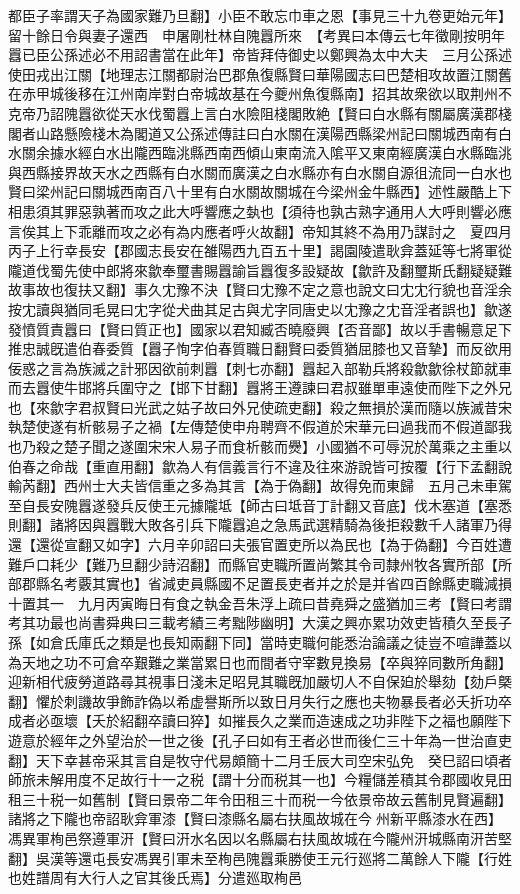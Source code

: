 都臣子率謂天子為國家難乃旦翻】小臣不敢忘巾車之恩【事見三十九卷更始元年】留十餘日令與妻子還西　申屠剛杜林自隗囂所來　【考異曰本傳云七年徵剛按明年囂已臣公孫述必不用詔書當在此年】帝皆拜侍御史以鄭興為太中大夫　三月公孫述使田戎出江關【地理志江關都尉治巴郡魚復縣賢曰華陽國志曰巴楚相攻故置江關舊在赤甲城後移在江州南岸對白帝城故基在今夔州魚復縣南】招其故衆欲以取荆州不克帝乃詔隗囂欲從天水伐蜀囂上言白水險阻棧閣敗絶【賢曰白水縣有關屬廣漢郡棧閣者山路懸險棧木為閣道又公孫述傳註曰白水關在漢陽西縣梁州記曰關城西南有白水關余據水經白水出隴西臨洮縣西南西傾山東南流入隂平又東南經廣漢白水縣臨洮與西縣接界故天水之西縣有白水關而廣漢之白水縣亦有白水關自源徂流同一白水也賢曰梁州記曰關城西南百八十里有白水關故關城在今梁州金牛縣西】述性嚴酷上下相患須其罪惡孰著而攻之此大呼響應之埶也【須待也孰古熟字通用人大呼則響必應言俟其上下乖離而攻之必有為内應者呼火故翻】帝知其終不為用乃謀討之　夏四月丙子上行幸長安【郡國志長安在雒陽西九百五十里】謁園陵遣耿弇蓋延等七將軍從隴道伐蜀先使中郎將來歙奉璽書賜囂諭旨囂復多設疑故【歙許及翻璽斯氏翻疑疑難故事故也復扶又翻】事久冘豫不決【賢曰冘豫不定之意也說文曰冘冘行貌也音淫余按冘讀與猶同毛晃曰冘字從犬曲其足古與尤字同唐史以冘豫之冘音淫者誤也】歙遂發憤質責囂曰【賢曰質正也】國家以君知臧否曉廢興【否音鄙】故以手書暢意足下推忠誠旣遣伯春委質【囂子恂字伯春質職日翻賢曰委質猶屈膝也又音摯】而反欲用佞惑之言為族滅之計邪因欲前刺囂【刺七亦翻】囂起入部勒兵將殺歙歙徐杖節就車而去囂使牛邯將兵圍守之【邯下甘翻】囂將王遵諫曰君叔雖單車遠使而陛下之外兄也【來歙字君叔賢曰光武之姑子故曰外兄使疏吏翻】殺之無損於漢而隨以族滅昔宋執楚使遂有析骸易子之禍【左傳楚使申舟聘齊不假道於宋華元曰過我而不假道鄙我也乃殺之楚子聞之遂圍宋宋人易子而食析骸而㸑】小國猶不可辱況於萬乘之主重以伯春之命哉【重直用翻】歙為人有信義言行不違及往來游說皆可按覆【行下孟翻說輸芮翻】西州士大夫皆信重之多為其言【為于偽翻】故得免而東歸　五月己未車駕至自長安隗囂遂發兵反使王元據隴坻【師古曰坻音丁計翻又音底】伐木塞道【塞悉則翻】諸將因與囂戰大敗各引兵下隴囂追之急馬武選精騎為後拒殺數千人諸軍乃得還【還從宣翻又如字】六月辛卯詔曰夫張官置吏所以為民也【為于偽翻】今百姓遭難戶口耗少【難乃旦翻少詩沼翻】而縣官吏職所置尚繁其令司隸州牧各實所部【所部郡縣名考覈其實也】省減吏員縣國不足置長吏者并之於是并省四百餘縣吏職減損十置其一　九月丙寅晦日有食之執金吾朱浮上疏曰昔堯舜之盛猶加三考【賢曰考謂考其功最也尚書舜典曰三載考績三考黜陟幽明】大漢之興亦累功效吏皆積久至長子孫【如倉氏庫氏之類是也長知兩翻下同】當時吏職何能悉治論議之徒豈不喧譁蓋以為天地之功不可倉卒艱難之業當累日也而間者守宰數見換易【卒與猝同數所角翻】迎新相代疲勞道路尋其視事日淺未足昭見其職旣加嚴切人不自保廹於舉劾【劾戶槩翻】懼於刺譏故爭飾詐偽以希虚譽斯所以致日月失行之應也夫物暴長者必夭折功卒成者必亟壞【夭於紹翻卒讀曰猝】如摧長久之業而造速成之功非陛下之福也願陛下遊意於經年之外望治於一世之後【孔子曰如有王者必世而後仁三十年為一世治直吏翻】天下幸甚帝采其言自是牧守代易頗簡十二月壬辰大司空宋弘免　癸巳詔曰頃者師旅未解用度不足故行十一之税【謂十分而税其一也】今糧儲差積其令郡國收見田租三十税一如舊制【賢曰景帝二年令田租三十而税一今依景帝故云舊制見賢遍翻】　諸將之下隴也帝詔耿弇軍漆【賢曰漆縣名屬右扶風故城在今州新平縣漆水在西】馮異軍栒邑祭遵軍汧【賢曰汧水名因以名縣屬右扶風故城在今隴州汧城縣南汧苦堅翻】吳漢等還屯長安馮異引軍未至栒邑隗囂乘勝使王元行廵將二萬餘人下隴【行姓也姓譜周有大行人之官其後氏焉】分遣廵取栒邑